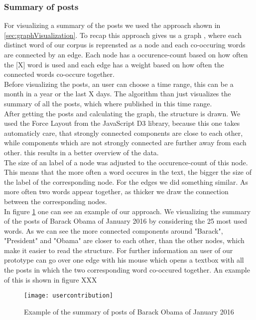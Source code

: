 \subsubsection{Summary of posts}
For visualizing a summary of the posts we used the approach shown in \ref{sec:graphVisualization}. To recap this approach gives us a graph , where each distinct word of our corpus is reprensted as  a node and each co-occuring words are connected by an edge. Each node has a occurence-count based on how often the [X] word is used and each edge has a weight based on how often the connected words co-occure together. \\
Before visualizing the posts, an user can choose a time range, this can be a month in a year or the last X days. The algorithm than just visualizes the summary of all the posts, which where published in this time range. \\
After getting the posts and calculating the graph, the structure is drawn. We used the Force Layout from the JavaScript D3 library, because this one takes automaticly care, that strongly connected components are close to each other, while components which are not strongly connected are further away from each other. this results in a better overview of the data. \\
The size of an label of a node was adjusted to the occurence-count of this node. This means that the more often a word occures in the text, the bigger the size of the label of the corresponding node. For the edges we did something similar. As more often two words appear together, as thicker we draw the connection between the corresponding nodes. \\
In  figure \ref{fig:summary} one can see an example of our approach. We visualizing the summary of the posts of Barack Obama of January 2016 by considering the 25 most used words. As we can see the more connected components around "Barack", "President" and "Obama" are closer to each other, than the other nodes, which make it easier to read the structure. For further information an user of our prototype can go over one edge with his mouse which opens a textbox with all the posts in which the two corresponding word co-occured together. An example of this is shown in figure XXX 

\begin{figure}[t]
	\centering
	\texttt{[image: usercontribution]}
	\caption[ContributonOverTime]{Example of the summary of posts of Barack Obama of January 2016}
	\label{fig:summary}
\end{figure}

